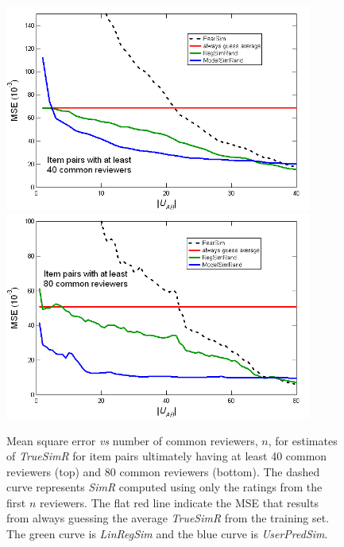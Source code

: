 \documentclass[11pt]{article}
\begin{document}
{\begin{figure}[!htbp]
    \centering
    \includegraphics[width=0.9\textwidth]{MSE_SimR_40.png}
    \includegraphics[width=0.9\textwidth]{MSE_SimR_80.png}
	\caption{Mean square error {\em vs} number of common reviewers, $n$, for
estimates of {\em TrueSimR} for item pairs ultimately having at least 40 common
reviewers (top) and 80 common reviewers (bottom). The dashed curve represents
{\em SimR} computed using only the ratings from the first $n$ reviewers. The
flat red line indicate the MSE that results from always guessing the average
{\em TrueSimR} from the training set. The green curve is {\em LinRegSim} and the
blue curve is {\em UserPredSim}. }
    \label{fig:MSE_SimR}
\end{figure}

}
\end{document}
